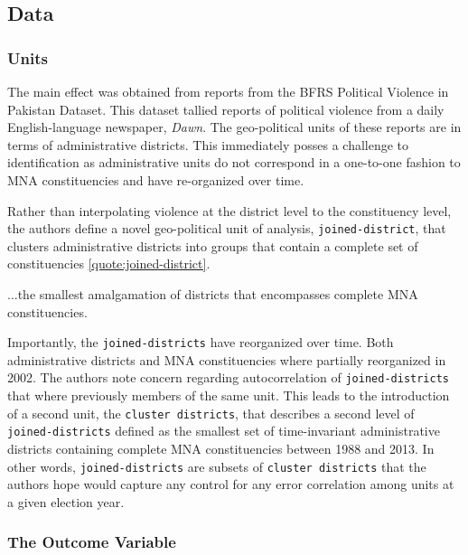 \documentclass{scrartcl}
\begin{document}
\subsection{Data} \label{data}


\subsubsection{Units} \label{unit}
The main effect was obtained from reports from the BFRS Political Violence in Pakistan Dataset. This dataset tallied reports of political violence from a daily English-language newspaper, \textit{Dawn}. The geo-political units of these reports are in terms of administrative districts. This immediately posses a challenge to identification as administrative units do not correspond in a one-to-one fashion to MNA constituencies and have re-organized over time.

Rather than interpolating violence at the district level to the constituency level, the authors define a novel geo-political unit of analysis, \texttt{joined-district}, that clusters administrative districts into groups that contain a complete set of constituencies \ref{quote:joined-district}.

\begin{displayquote} \label{quote:joined-district}
  ...the smallest amalgamation of districts that encompasses complete MNA constituencies. 
\end{displayquote}

Importantly, the \texttt{joined-districts} have reorganized over time.
Both administrative districts and MNA constituencies where partially reorganized in 2002.
The authors note concern regarding autocorrelation of \texttt{joined-districts} that where previously members of the same unit. 
This leads to the introduction of a second unit, the \texttt{cluster districts}, that describes a second level of \texttt{joined-districts} defined as the smallest set of time-invariant administrative districts containing complete MNA constituencies between 1988 and 2013.
In other words, \texttt{joined-districts} are subsets of \texttt{cluster districts} that the authors hope would capture any control for any error correlation among units at a given election year.


\subsubsection{The Outcome Variable} \label{outcome}
\end{document}
